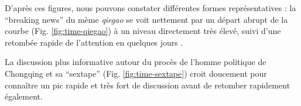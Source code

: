 D{\textquoteright}apr\`es ces figures, nous pouvons constater diff\'erentes formes repr\'esentatives : la {\textquotedblleft}breaking news{\textquotedblright} du m\`eme \textit{qiegao} se voit nettement par un d\'epart abrupt de la courbe (Fig. \ref{fig:time-qiegao}) \`a un niveau directement tr\`es \'elev\'e, suivi d{\textquoteright}une retomb\'ee rapide de l{\textquoteright}attention en quelques jours .  

La discussion plus informative autour du proc\`es de l{\textquoteright}homme politique de Chongqing et sa {\textquotedblleft}sextape{\textquotedblright} (Fig. \ref{fig:time-sextape}) croit doucement pour conna\^itre un pic rapide et tr\`es fort de discussion avant de retomber rapidement \'egalement.  

\begin{figure}[ht]
    \centering
    \newline
    \newline
\end{figure}
